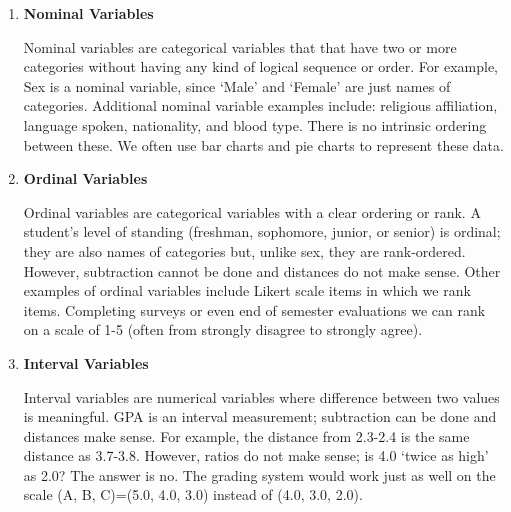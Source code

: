 \documentclass[11pt, chapterprefix=true]{scrbook}\usepackage[]{graphicx}\usepackage[]{color}
\begin{document}
\begin{enumerate}
\item \textbf{Nominal Variables}

Nominal variables are categorical variables that that have two or more categories without having any kind of logical sequence or order. For example, Sex is a nominal variable, since `Male' and `Female' are just names of categories.  Additional nominal variable examples include: religious affiliation, language spoken, nationality, and blood type.   There is no intrinsic ordering between these.  We often use bar charts and pie charts to represent these data.


\item \textbf{Ordinal Variables}

Ordinal variables are categorical variables with a clear ordering or rank.  A student's level of standing (freshman, sophomore, junior, or senior) is ordinal; they are also names of categories but, unlike sex, they are rank-ordered.   However, subtraction cannot be done and distances do not make sense.  Other examples of ordinal variables include Likert scale items in which we rank items.  Completing surveys or even end of semester evaluations we can rank on a scale of 1-5 (often from strongly disagree to strongly agree).


\item \textbf{Interval Variables}

Interval variables are numerical variables where difference between two values is meaningful.  GPA is an interval measurement; subtraction can be done and distances make sense.  For example, the distance from 2.3-2.4 is the same distance as 3.7-3.8.  However, ratios do not make sense; is 4.0 `twice as high' as 2.0?  The answer is no.  The grading system would work just as well on the scale (A, B, C)=(5.0, 4.0, 3.0) instead of (4.0, 3.0, 2.0).


\end{enumerate}
\end{document}
